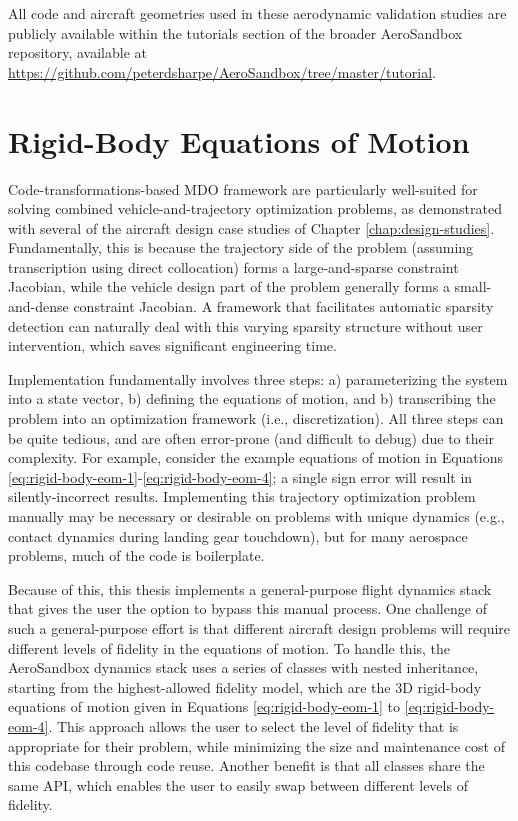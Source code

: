 All code and aircraft geometries used in these aerodynamic validation studies are publicly available within the tutorials section of the broader AeroSandbox repository, available at \url{https://github.com/peterdsharpe/AeroSandbox/tree/master/tutorial}.


\section{Rigid-Body Equations of Motion}
\label{sec:dynamics}

Code-transformations-based MDO framework are particularly well-suited for solving combined vehicle-and-trajectory optimization problems, as demonstrated with several of the aircraft design case studies of Chapter \ref{chap:design-studies}. Fundamentally, this is because the trajectory side of the problem (assuming transcription using direct collocation) forms a large-and-sparse constraint Jacobian, while the vehicle design part of the problem generally forms a small-and-dense constraint Jacobian. A framework that facilitates automatic sparsity detection can naturally deal with this varying sparsity structure without user intervention, which saves significant engineering time.

Implementation fundamentally involves three steps: a) parameterizing the system into a state vector, b) defining the equations of motion, and b) transcribing the problem into an optimization framework (i.e., discretization). All three steps can be quite tedious, and are often error-prone (and difficult to debug) due to their complexity. For example, consider the example equations of motion in Equations \ref{eq:rigid-body-eom-1}-\ref{eq:rigid-body-eom-4}; a single sign error will result in silently-incorrect results. Implementing this trajectory optimization problem manually may be necessary or desirable on problems with unique dynamics (e.g., contact dynamics during landing gear touchdown), but for many aerospace problems, much of the code is boilerplate.

Because of this, this thesis implements a general-purpose flight dynamics stack that gives the user the option to bypass this manual process. One challenge of such a general-purpose effort is that different aircraft design problems will require different levels of fidelity in the equations of motion. To handle this, the AeroSandbox dynamics stack uses a series of classes with nested inheritance, starting from the highest-allowed fidelity model, which are the 3D rigid-body equations of motion given in Equations \ref{eq:rigid-body-eom-1} to \ref{eq:rigid-body-eom-4}. This approach allows the user to select the level of fidelity that is appropriate for their problem, while minimizing the size and maintenance cost of this codebase through code reuse. Another benefit is that all classes share the same API, which enables the user to easily swap between different levels of fidelity.

